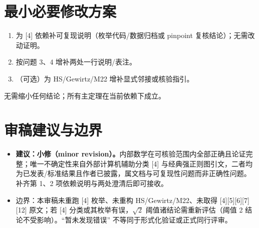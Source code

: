 \documentclass[UTF8,11pt]{ctexart}
\begin{document}
\section{最小必要修改方案}
\begin{enumerate}
\item 为 [4] 依赖补可复现说明（枚举代码/数据归档或 pinpoint 复核结论）；无需改动证明。
\item 按问题 3、4 增补两处一行说明/表注。
\item （可选）为 HS/Gewirtz/M22 增补显式邻接或核验指引。
\end{enumerate}
\noindent 无需缩小任何结论；所有主定理在当前依赖下成立。

\section{审稿建议与边界}
\begin{itemize}
\item \textbf{建议：小修（minor revision）。}内部数学在可核验范围内全部正确且论证完整；唯一不确定性来自外部计算机辅助分类 [4] 与经典强正则图引文，二者均为已发表/标准结果且作者已披露，属文档与可复现性问题而非正确性问题。补齐第 1、2 项依赖说明与两处澄清后即可接收。
\item 边界：本审稿未重跑 [4] 枚举、未重构 HS/Gewirtz/M22、未取得 [4][5][6][7][12] 原文；若 [4] 分类或其枚举有误，$\sqrt2$ 阈值诸结论需重新评估（阈值 2 结论不受影响）。``暂未发现错误'' 不等同于形式化验证或正式同行评审。
\end{itemize}
\end{document}
